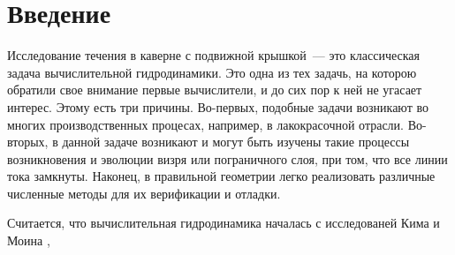 \section*{Введение \cite{introduction}}

Исследование течения в каверне с подвижной крышкой~--- это классическая задача вычислительной гидродинамики. Это одна из тех задачь, на которою обратили свое внимание первые вычислители, и до сих пор к ней не угасает интерес. Этому есть три причины. Во-первых, подобные задачи возникают во многих производственных процесах, например, в лакокрасочной отрасли. Во-вторых, в данной задаче возникают и могут быть изучены такие процессы возникновения и эволюции визря или пограничного слоя, при том, что все линии тока замкнуты. Наконец, в правильной геометрии легко реализовать различные численные методы для их верификации и отладки.

Считается, что вычислительная гидродинамика началась с исследованей Кима и Моина \cite{KimMoin}, 
 
